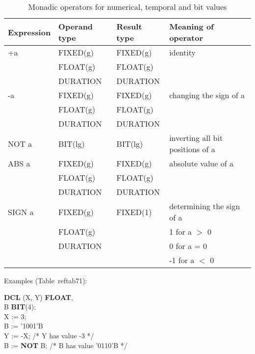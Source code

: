 \begin{table} %
\begin{center}
\caption{Monadic operators for numerical, temporal and bit values}
\label{tab71}
\vspace{5mm}
\begin{tabular}{|l|l|l|l|} 
\hline
{\bf Expression} & {\bf Operand type} & {\bf Result type} & {\bf Meaning of operator}\\ \hline

+a               & FIXED(g)          & FIXED(g)         & identity\\
                 & FLOAT(g)          & FLOAT(g)         & \\
                 & DURATION          & DURATION         & \\ \hline

-a               & FIXED(g)          & FIXED(g)         & changing the sign of a\\
                 & FLOAT(g)          & FLOAT(g)         & \\
                 & DURATION          & DURATION         & \\ \hline

NOT a            & BIT(lg)           & BIT(lg)          & inverting all bit positions of a\\ \hline

ABS a            & FIXED(g)          & FIXED(g)         & absolute value of a\\
                 & FLOAT(g)          & FLOAT(g)         & \\
                 & DURATION          & DURATION         & \\ \hline

SIGN a           & FIXED(g)          & FIXED(1)         & determining the sign of a\\ 
                 & FLOAT(g)          &                  & 1 for a $>$ 0\\
                 & DURATION          &                  & 0 for a = 0\\   
                 &                   &                  & -1 for a $<$ 0\\
\hline
\end{tabular}
\end{center}
\end{table}

Examples (Table~ref{tab71}):

\begin{tabbing}
{\bf DCL} (X, Y) \= {\bf FLOAT},  \= \\
\x        B      \> {\bf BIT}(4); \> \\
X := 3;            \> \> \\
B := '1001'B       \> \> \\
Y := -X;           \> \> /* Y has value -3 */\\
B := {\bf NOT} B;  \> \> /* B has value '0110'B */\\
\end{tabbing}

